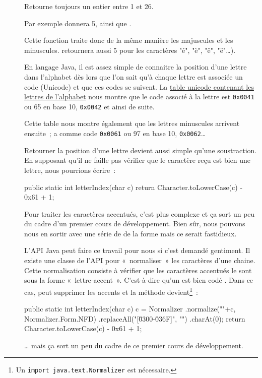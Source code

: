 	\begin{description}
	
		\item[]
		Retourne toujours un entier entre 1 et 26. 

		Par exemple  donnera 5, 
		ainsi que . 
		
		Cette fonction traite donc de la même manière les majuscules et les
		minuscules.   retournera aussi 5 pour les caractères "é",
		"è", "ê", "ë"\dots).  

		En langage Java, il est assez simple de connaitre la position d'une
		lettre dans l'alphabet dès lors que l'on sait qu'à chaque lettre est
		associée un code (Unicode) et que ces codes se suivent. La
		\href{https://www.unicode.org/charts/PDF/U0000.pdf}{table unicode
		contenant les lettres de l'alphabet} nous montre que le code associé
		à la lettre  est \texttt{0x0041} ou 65 en base 10, 
		\texttt{0x0042} et ainsi de suite. 
		
		Cette table nous montre également que les lettres minuscules arrivent
		ensuite~;  a comme code \texttt{0x0061} ou 97 en base 10,
		 \texttt{0x0062}…

		Retourner la position d'une lettre devient aussi simple qu'une
		soustraction. En supposant qu'il ne faille pas vérifier que le caractère
		reçu est bien une lettre, nous pourrions écrire~:

		\begin{java}
public static int letterIndex(char c){
	return Character.toLowerCase(c) - 0x61 + 1;
}
		\end{java}

		Pour traiter les caractères accentués, c'est plus complexe et ça sort un
		peu du cadre d'un premier cours de développement. Bien sûr, nous pouvons
		nous en sortir avec une série de  de la forme  mais ce serait fastidieux. 

		L'API Java peut faire ce travail pour nous si c'est demandé gentiment.
		Il existe une classe de l'API pour «~normaliser~» les caractères d'une
		chaine. Cette normalisation consiste à vérifier que les caractères
		accentués le sont sous la forme «~lettre-accent~». C'est-à-dire qu'un
		 est bien codé . Dans ce cas,  peut
		supprimer les accents et la méthode devient\footnote{Un \texttt{import
		java.text.Normalizer} est nécessaire.}~:

		\begin{java}
public static int letterIndex(char c){
	c = Normalizer
		.normalize(""+c, Normalizer.Form.NFD)
		.replaceAll("[\u0300-\u036F]", "")
		.charAt(0);
	return Character.toLowerCase(c) - 0x61 + 1;
}
		\end{java}

		… mais ça sort un peu du cadre de ce premier cours de développement. 
		
	\end{description}
	
